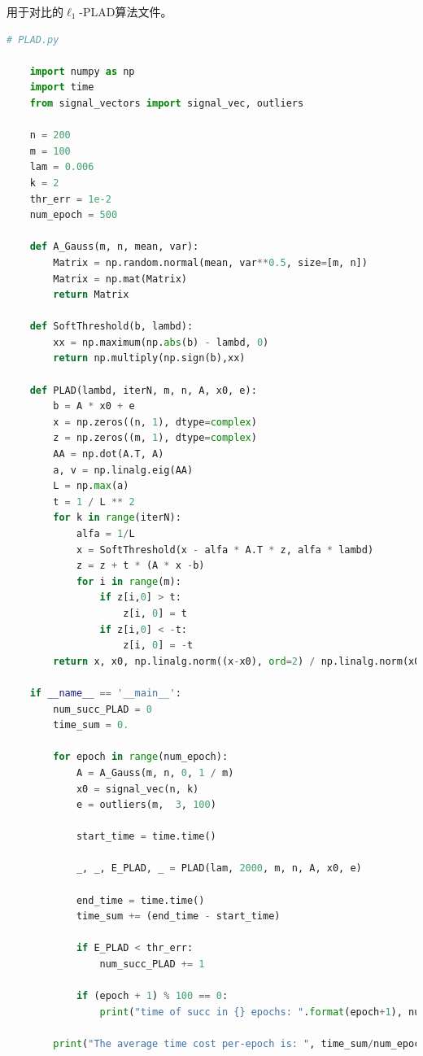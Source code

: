 \documentclass[AutoFakeBold]{LZUThesis}
\begin{document}
用于对比的$\ell_1$-PLAD算法文件。

\begin{lstlisting}[language = python]
    # PLAD.py

    import numpy as np
    import time
    from signal_vectors import signal_vec, outliers

    n = 200
    m = 100
    lam = 0.006
    k = 2
    thr_err = 1e-2
    num_epoch = 500

    def A_Gauss(m, n, mean, var):
        Matrix = np.random.normal(mean, var**0.5, size=[m, n])
        Matrix = np.mat(Matrix)
        return Matrix

    def SoftThreshold(b, lambd):
        xx = np.maximum(np.abs(b) - lambd, 0)
        return np.multiply(np.sign(b),xx)

    def PLAD(lambd, iterN, m, n, A, x0, e):
        b = A * x0 + e
        x = np.zeros((n, 1), dtype=complex)
        z = np.zeros((m, 1), dtype=complex)
        AA = np.dot(A.T, A)
        a, v = np.linalg.eig(AA)
        L = np.max(a)
        t = 1 / L ** 2
        for k in range(iterN):
            alfa = 1/L
            x = SoftThreshold(x - alfa * A.T * z, alfa * lambd)
            z = z + t * (A * x -b)
            for i in range(m):
                if z[i,0] > t:
                    z[i, 0] = t
                if z[i,0] < -t:
                    z[i, 0] = -t
        return x, x0, np.linalg.norm((x-x0), ord=2) / np.linalg.norm(x0, ord=2), max(np.abs(A.T*e))

    if __name__ == '__main__':
        num_succ_PLAD = 0
        time_sum = 0.

        for epoch in range(num_epoch):
            A = A_Gauss(m, n, 0, 1 / m)
            x0 = signal_vec(n, k)
            e = outliers(m,  3, 100)

            start_time = time.time()

            _, _, E_PLAD, _ = PLAD(lam, 2000, m, n, A, x0, e)

            end_time = time.time()
            time_sum += (end_time - start_time)

            if E_PLAD < thr_err:
                num_succ_PLAD += 1

            if (epoch + 1) % 100 == 0:
                print("time of succ in {} epochs: ".format(epoch+1), num_succ_PLAD)

        print("The average time cost per-epoch is: ", time_sum/num_epoch)
\end{lstlisting}
\end{document}
